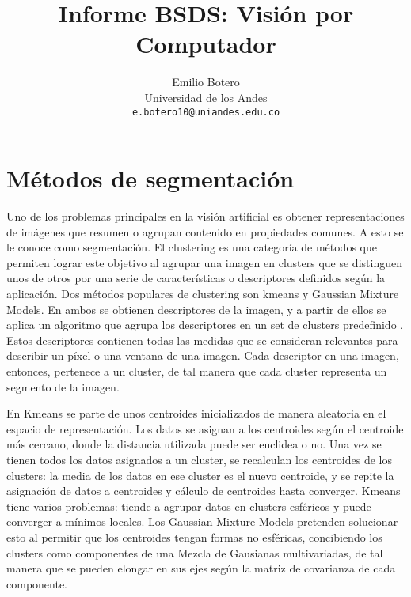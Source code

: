 \documentclass[10pt,twocolumn,letterpaper]{article}
\begin{document}
\title{Informe BSDS: Visión por Computador}

\author{Emilio Botero\\
Universidad de los Andes\\
{\tt\small e.botero10@uniandes.edu.co}
}

\maketitle


\section{Métodos de segmentación}

Uno de los problemas principales en la visión artificial es obtener representaciones de imágenes que resumen o agrupan contenido en propiedades comunes. A esto se le conoce como segmentación. El clustering es una categoría de métodos que permiten lograr este objetivo al agrupar una imagen en clusters que se distinguen unos de otros por una serie de características o descriptores definidos según la aplicación. Dos métodos populares de clustering son kmeans y Gaussian Mixture Models. En ambos se obtienen descriptores de la imagen, y a partir de ellos se aplica un algoritmo que agrupa los descriptores en un set de clusters predefinido \cite{1_forsyth_ponce_2012}. Estos descriptores contienen todas las medidas que se consideran relevantes para describir un píxel o una ventana de una imagen. Cada descriptor en una imagen, entonces, pertenece a un cluster, de tal manera que cada cluster representa un segmento de la imagen.

En Kmeans se parte de unos centroides inicializados de manera aleatoria en el espacio de representación. Los datos se asignan a los centroides según el centroide más cercano, donde la distancia utilizada puede ser euclidea o no. Una vez se tienen todos los datos asignados a un cluster, se recalculan los centroides de los clusters: la media de los datos en ese cluster es el nuevo centroide, y se repite la asignación de datos a centroides y cálculo de centroides hasta converger. Kmeans tiene varios problemas: tiende a agrupar datos en clusters esféricos y puede converger a mínimos locales. Los Gaussian Mixture Models pretenden solucionar esto al permitir que los centroides tengan formas no esféricas, concibiendo los clusters como componentes de una Mezcla de Gausianas multivariadas, de tal manera que se pueden elongar en sus ejes según la matriz de covarianza de cada componente. 
\end{document}
